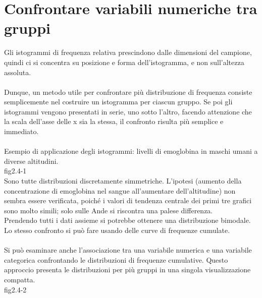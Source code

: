 \documentclass[drafts, 10pt]{book}
\begin{document}
\section{Confrontare variabili numeriche tra gruppi}
Gli istogrammi di frequenza relativa prescindono dalle dimensioni del campione, quindi ci si concentra su posizione e forma dell’istogramma, e non sull’altezza assoluta.
\\
\\
Dunque, un metodo utile per confrontare più distribuzione di frequenza consiste semplicemente nel costruire un istogramma per ciascun gruppo. Se poi gli istogrammi vengono presentati in serie, uno sotto l'altro, facendo attenzione che la scala dell'asse delle x sia la stessa, il confronto risulta più semplice e immediato.
\\
\\
Esempio di applicazione degli istogrammi: livelli di emoglobina in maschi umani a diverse altitudini.
\\
fig2.4-1\label{fig2.4-1}
\\
Sono tutte distribuzioni discretamente simmetriche. L’ipotesi (aumento della concentrazione di emoglobina nel sangue all’aumentare dell’altitudine) non sembra essere verificata, poiché i valori di tendenza centrale dei primi tre grafici sono molto simili; solo sulle Ande si riscontra una palese differenza.
\\
Prendendo tutti i dati assieme si potrebbe ottenere una distribuzione bimodale.
\\
Lo stesso confronto si può fare usando delle curve di frequenze cumulate.
\\
\\
Si può esaminare anche l'associazione tra una variabile numerica e una variabile categorica confrontando le distribuzioni di frequenze cumulative. Questo approccio presenta le distribuzioni per più gruppi in una singola visualizzazione compatta.
\\
fig2.4-2\label{fig2.4-2}
\end{document}

